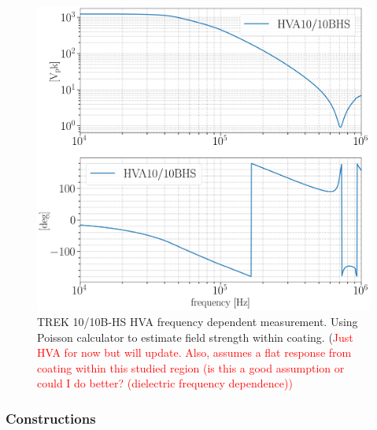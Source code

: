 \begin{figure}[H]
\centering
\includegraphics[width=.75\textwidth]{figs/ALGAAS/HVA_TREK1010BHS_1260V_out.png}
\caption{TREK 10/10B-HS HVA frequency dependent measurement. Using Poisson calculator to estimate field strength within coating. (\textcolor{red}{Just HVA for now but will update.} \textcolor{red}{Also, assumes a flat response from coating within this studied region (is this a good assumption or could I do better? (dielectric frequency dependence))}}
\label{fig:Ez}
\end{figure}

\subsubsection{Constructions}

